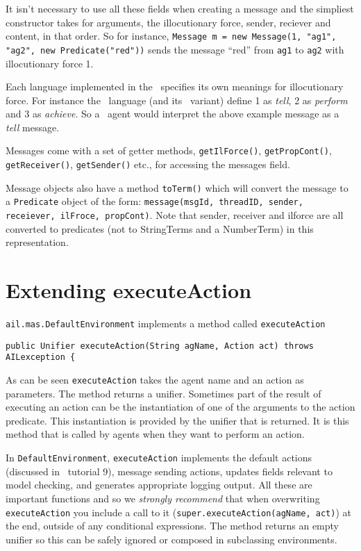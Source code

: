 It isn't necessary to use all these fields when creating a message and the simpliest constructor takes for arguments, the illocutionary force, sender, reciever and content, in that order.  So for instance, \texttt{Message m = new Message(1, "ag1", "ag2", new Predicate("red"))} sends the message ``red'' from \texttt{ag1} to \texttt{ag2} with illocutionary force 1.

Each language implemented in the \ail\ specifies its own meanings for illocutionary force.  For instance the \gwendolen\ language (and its \eass\ variant) define 1 as \emph{tell}, 2 as \emph{perform} and 3 as \emph{achieve}.  So a \gwendolen\ agent would interpret the above example message as a \emph{tell} message.

Messages come with a set of getter methods, \texttt{getIlForce()}, \texttt{getPropCont()}, \texttt{getReceiver()}, \texttt{getSender()} etc., for accessing the messages field.

Message objects also have a method \texttt{toTerm()} which will convert the message to a \texttt{Predicate} object of the form: \texttt{message(msgId, threadID, sender, receiever, ilFroce, propCont)}.  Note that sender, receiver and ilforce are all converted to predicates (not to StringTerms and a NumberTerm) in this representation.

\section{Extending executeAction}
\texttt{ail.mas.DefaultEnvironment} implements a method called \texttt{executeAction}

\begin{verbatim}
public Unifier executeAction(String agName, Action act) throws AILexception {
\end{verbatim}

As can be seen \texttt{executeAction} takes the agent name and an action as parameters.  The method returns a unifier.  Sometimes part of the result of executing an action can be the instantiation of one of the arguments to the action predicate.  This instantiation is provided by the unifier that is returned.  It is this method that is called by agents when they want to perform an action.

In \texttt{DefaultEnvironment}, \texttt{executeAction} implements the default actions (discussed in \gwendolen\ tutorial 9), message sending actions, updates fields relevant to model checking, and generates appropriate logging output.   All these are important functions and so we \emph{strongly recommend} that when overwriting \texttt{executeAction} you include a call to it (\texttt{super.executeAction(agName, act)}) at the end, outside of any conditional expressions.  The method returns an empty unifier so this can be safely ignored or composed in subclassing environments.

